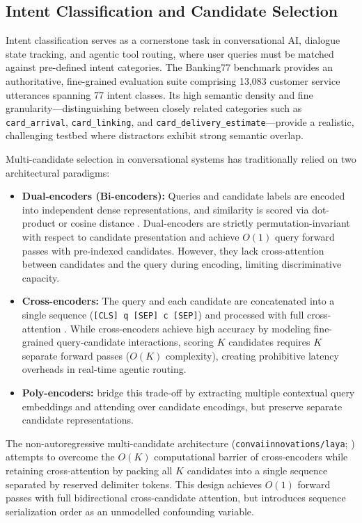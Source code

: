 \documentclass[11pt,a4paper]{article}
\begin{document}
\subsection{Intent Classification and Candidate Selection}
Intent classification serves as a cornerstone task in conversational AI, dialogue state tracking, and agentic tool routing, where user queries must be matched against pre-defined intent categories. The Banking77 benchmark \citep{casanueva2020efficient} provides an authoritative, fine-grained evaluation suite comprising 13,083 customer service utterances spanning 77 intent classes. Its high semantic density and fine granularity---distinguishing between closely related categories such as \texttt{card\_arrival}, \texttt{card\_linking}, and \texttt{card\_delivery\_estimate}---provide a realistic, challenging testbed where distractors exhibit strong semantic overlap.

Multi-candidate selection in conversational systems has traditionally relied on two architectural paradigms:
\begin{itemize}
    \item \textbf{Dual-encoders (Bi-encoders):} Queries and candidate labels are encoded into independent dense representations, and similarity is scored via dot-product or cosine distance \citep{casanueva2020efficient}. Dual-encoders are strictly permutation-invariant with respect to candidate presentation and achieve $O(1)$ query forward passes with pre-indexed candidates. However, they lack cross-attention between candidates and the query during encoding, limiting discriminative capacity.
    \item \textbf{Cross-encoders:} The query and each candidate are concatenated into a single sequence (\texttt{[CLS] q [SEP] c [SEP]}) and processed with full cross-attention \citep{nogueira2019passage}. While cross-encoders achieve high accuracy by modeling fine-grained query-candidate interactions, scoring $K$ candidates requires $K$ separate forward passes ($O(K)$ complexity), creating prohibitive latency overheads in real-time agentic routing.
    \item \textbf{Poly-encoders:} \citet{humeau2020polyencoders} bridge this trade-off by extracting multiple contextual query embeddings and attending over candidate encodings, but preserve separate candidate representations.
\end{itemize}
The non-autoregressive multi-candidate architecture (\texttt{convaiinnovations/laya}; \citealp{laya2024}) attempts to overcome the $O(K)$ computational barrier of cross-encoders while retaining cross-attention by packing all $K$ candidates into a single sequence separated by reserved delimiter tokens. This design achieves $O(1)$ forward passes with full bidirectional cross-candidate attention, but introduces sequence serialization order as an unmodelled confounding variable.
\end{document}

